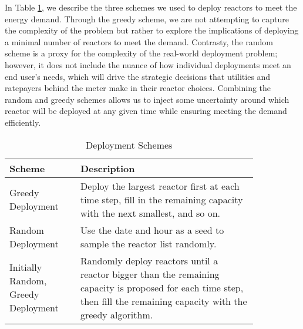 \documentclass{anstrans}
\begin{document}
In Table \ref{tab:deployment_schemes}, we describe the three schemes we used to deploy reactors to meet the energy demand. Through the greedy scheme, we are not attempting to capture the complexity of the problem but rather to explore the implications of deploying a minimal number of reactors to meet the demand. Contrasty, the random scheme is a proxy for the complexity of the real-world deployment problem; however, it does not include the nuance of how individual deployments meet an end user's needs, which will drive the strategic decisions that utilities and ratepayers behind the meter make in their reactor choices. Combining the random and greedy schemes allows us to inject some uncertainty around which reactor will be deployed at any given time while ensuring meeting the demand efficiently.

\begin{table}[h]
  \centering
  \caption{Deployment Schemes}
  \label{tab:deployment_schemes}
  \begin{tabular}{>{\raggedright}p{0.24\linewidth}>{\raggedright\arraybackslash}p{0.60\linewidth}}
      \hline
      Scheme & Description \\
      \hline
      Greedy Deployment & Deploy the largest
      reactor first at each time step, fill in the remaining capacity with
      the next smallest, and so on. \vspace{2mm}\\
      Random Deployment & Use the date and hour as a seed to sample the
      reactor list randomly. \vspace{2mm}\\
      Initially Random, Greedy Deployment & Randomly deploy reactors until
      a reactor bigger than the remaining capacity is proposed for each time step,
      then fill the remaining capacity with the greedy algorithm. \\
      \hline
  \end{tabular}
\end{table}

\end{document}
